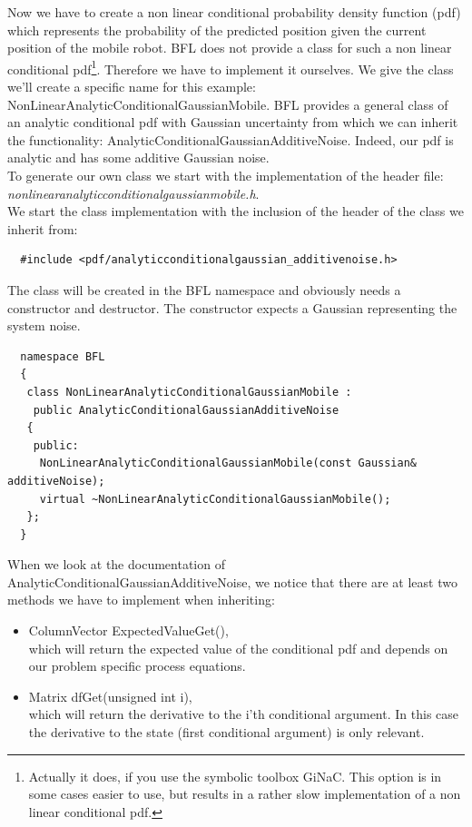 \documentclass[a4paper,10pt]{report}
\begin{document}
Now we have to create a non linear conditional probability density
function (pdf) which represents the probability of the predicted
position given the current position of the mobile robot. BFL does not
provide a class for such a non linear conditional
pdf\footnote{Actually it does, if you use the symbolic toolbox GiNaC.
  This option is in some cases easier to use, but results in a rather
  slow implementation of a non linear conditional pdf.}. Therefore we
have to implement it ourselves.  We give the class we'll create a
specific name for this example:
NonLinearAnalyticConditionalGaussianMobile.  BFL provides a general
class of an analytic conditional pdf with Gaussian uncertainty from
which we can inherit the functionality:
AnalyticConditionalGaussianAdditiveNoise.  Indeed, our pdf is analytic
and has some additive Gaussian noise.\\
To generate our own class we start with the implementation of the
header file: \emph{nonlinearanalyticconditionalgaussianmobile.h}.\\
We start the class implementation with the inclusion of the header of
the class we inherit from:
\begin{verbatim}
  #include <pdf/analyticconditionalgaussian_additivenoise.h>
\end{verbatim}
The class will be created in the BFL namespace and obviously needs a
constructor and destructor. The constructor expects a Gaussian
representing the system noise.
\begin{verbatim}
  namespace BFL
  {
   class NonLinearAnalyticConditionalGaussianMobile : 
    public AnalyticConditionalGaussianAdditiveNoise
   {
    public:
     NonLinearAnalyticConditionalGaussianMobile(const Gaussian& additiveNoise);
     virtual ~NonLinearAnalyticConditionalGaussianMobile();
   };
  }
\end{verbatim}
When we look at the documentation of
AnalyticConditionalGaussianAdditiveNoise, we notice that there are at
least two methods we have to implement when inheriting:
\begin{itemize}
\item ColumnVector ExpectedValueGet(), \\which will return the
  expected value of the conditional pdf and depends on our problem
  specific process equations.
\item Matrix dfGet(unsigned int i),\\which will return the derivative
  to the i'th conditional argument. In this case the derivative to the
  state (first conditional argument) is only relevant.
\end{itemize}
\end{document}
